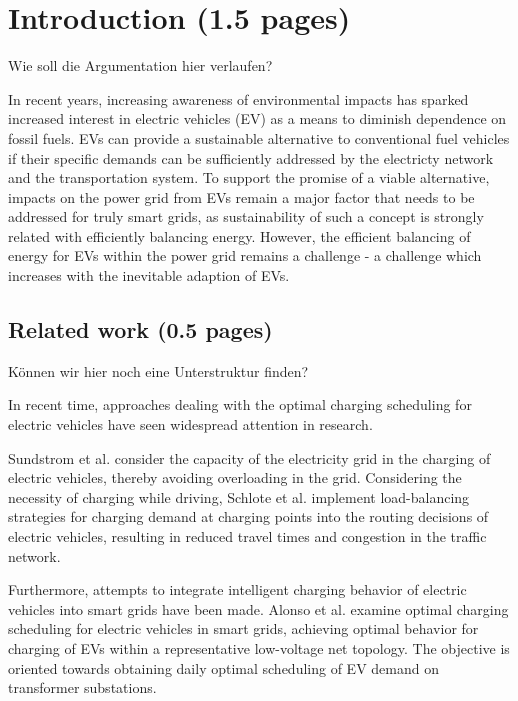 \section{Introduction (1.5 pages)}

{\color{red} Wie soll die Argumentation hier verlaufen?}

In recent years, increasing awareness of environmental impacts has sparked increased interest in electric vehicles (EV) as a means to diminish dependence on fossil fuels. EVs can provide a sustainable alternative to conventional fuel vehicles if their specific demands can be sufficiently addressed by the electricty network and the transportation system.
To support the promise of a viable alternative, impacts on the power grid from EVs remain a major factor that needs to be addressed for truly smart grids, as sustainability of such a concept is strongly related with efficiently balancing energy. 
However, the efficient balancing of energy for EVs within the power grid remains a challenge - a challenge which increases with the inevitable adaption of EVs. 

\subsection{Related work (0.5 pages)}
\label{section:related_work}

{\color{red} K\"onnen wir hier noch eine Unterstruktur finden?}

In recent time, approaches dealing with the optimal charging scheduling for electric vehicles have seen widespread attention in research.

Sundstrom et al. \cite{sundstrom2010planning} consider the capacity of the electricity grid in the charging of electric vehicles, thereby avoiding overloading in the grid.
Considering the necessity of charging while driving, Schlote et al. \cite{schlote2012balanced} implement load-balancing strategies for charging demand at charging points into the routing decisions of electric vehicles, resulting in reduced travel times and congestion in the traffic network. 

Furthermore, attempts to integrate intelligent charging behavior of electric vehicles into smart grids have been made. 
Alonso et al. \cite{alonso2014optimal} examine optimal charging scheduling for electric vehicles in smart grids, achieving optimal behavior for charging of EVs within a representative low-voltage net topology. The objective is oriented towards obtaining daily optimal scheduling of EV demand on transformer substations.

